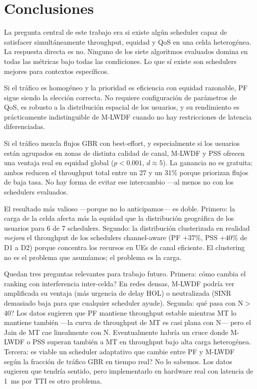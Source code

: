 \documentclass[conference]{IEEEtran}
\begin{document}
\section{Conclusiones}
\label{sec:conclusiones}

La pregunta central de este trabajo era si existe algún scheduler capaz de satisfacer
simultáneamente throughput, equidad y QoS en una celda heterogénea. La respuesta
directa es no. Ninguno de los siete algoritmos evaluados domina en todas las métricas
bajo todas las condiciones. Lo que sí existe son schedulers mejores para contextos
específicos.

Si el tráfico es homogéneo y la prioridad es eficiencia con equidad razonable, PF
sigue siendo la elección correcta. No requiere configuración de parámetros de QoS,
es robusto a la distribución espacial de los usuarios, y su rendimiento es prácticamente
indistinguible de M-LWDF cuando no hay restricciones de latencia diferenciadas.

Si el tráfico mezcla flujos GBR con best-effort, y especialmente si los usuarios están
agrupados en zonas de distinta calidad de canal, M-LWDF y PSS ofrecen una ventaja
real en equidad global ($p<0.001$, $d\approx5$). La ganancia no es gratuita: ambos reducen el throughput total entre un 27 y un 31\%
porque priorizan flujos de baja tasa. No hay forma de evitar ese intercambio ---al
menos no con los schedulers evaluados.

El resultado más valioso ---porque no lo anticipamos--- es doble. Primero: la carga de
la celda afecta más la equidad que la distribución geográfica de los usuarios para 6 de
7 schedulers. Segundo: la distribución clusterizada en realidad \emph{mejora} el
throughput de los schedulers channel-aware (PF $+37\%$, PSS $+40\%$ de D1 a D2) porque
concentra los recursos en UEs de canal eficiente. El clustering no es el problema que
asumíamos; el problema es la carga.

Quedan tres preguntas relevantes para trabajo futuro. Primera: \textquestiondown{}cómo cambia el ranking
con interferencia inter-celda? En redes densas, M-LWDF podría ver amplificada su
ventaja (más urgencia de delay HOL) o neutralizada (SINR demasiado baja para que
cualquier scheduler ayude). Segunda: \textquestiondown{}qué pasa con N$>$40? Los datos sugieren que PF
mantiene throughput estable mientras MT lo mantiene también ---la curva de throughput
de MT es casi plana con N--- pero el Jain de MT cae linealmente con N. Eventualmente
habría un cruce donde M-LWDF o PSS superan también a MT en throughput bajo alta carga
heterogénea. Tercera: \textquestiondown{}es viable un scheduler adaptativo que cambie entre PF y M-LWDF según la
fracción de tráfico GBR en tiempo real? No lo sabemos. Los datos sugieren que tendría
sentido, pero implementarlo en hardware real con latencia de 1~ms por TTI es otro problema.
\end{document}
